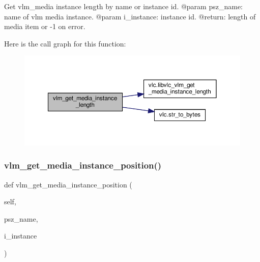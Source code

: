 \begin{DoxyVerb}Get vlm_media instance length by name or instance id.
@param psz_name: name of vlm media instance.
@param i_instance: instance id.
@return: length of media item or -1 on error.
\end{DoxyVerb}
 Here is the call graph for this function\+:
\nopagebreak
\begin{figure}[H]
\begin{center}
\leavevmode
\includegraphics[width=350pt]{classvlc_1_1_instance_afdfbfb3da424196fb3ada02d3af20c34_cgraph}
\end{center}
\end{figure}
\mbox{\label{classvlc_1_1_instance_aaeb05c756ee13453ef1ddb527c4a3971}} 
\subsubsection{\texorpdfstring{vlm\+\_\+get\+\_\+media\+\_\+instance\+\_\+position()}{vlm\_get\_media\_instance\_position()}}
{\footnotesize\ttfamily def vlm\+\_\+get\+\_\+media\+\_\+instance\+\_\+position (\begin{DoxyParamCaption}\item[{}]{self,  }\item[{}]{psz\+\_\+name,  }\item[{}]{i\+\_\+instance }\end{DoxyParamCaption})}

